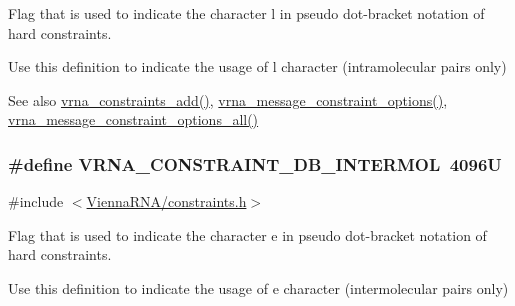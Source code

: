 Flag that is used to indicate the character \textquotesingle{}l\textquotesingle{} in pseudo dot-\/bracket notation of hard constraints. 

Use this definition to indicate the usage of \textquotesingle{}l\textquotesingle{} character (intramolecular pairs only)

\begin{DoxySeeAlso}{See also}
\hyperlink{group__constraints_ga35a401f680969a556858a8dd5f1d07cc}{vrna\+\_\+constraints\+\_\+add()}, \hyperlink{group__constraints_gaa1f20b53bf09ac2e6b0dbb13f7d89670}{vrna\+\_\+message\+\_\+constraint\+\_\+options()}, \hyperlink{group__constraints_gaec7e13fa0465c2acc7a621d1aecb709f}{vrna\+\_\+message\+\_\+constraint\+\_\+options\+\_\+all()} 
\end{DoxySeeAlso}
\hypertarget{group__constraints_ga31d0ebb9755ca8a4acafc14f00ca755d}{}
\subsubsection[{V\+R\+N\+A\+\_\+\+C\+O\+N\+S\+T\+R\+A\+I\+N\+T\+\_\+\+D\+B\+\_\+\+I\+N\+T\+E\+R\+M\+O\+L}]{\setlength{\rightskip}{0pt plus 5cm}\#define V\+R\+N\+A\+\_\+\+C\+O\+N\+S\+T\+R\+A\+I\+N\+T\+\_\+\+D\+B\+\_\+\+I\+N\+T\+E\+R\+M\+O\+L~4096\+U}\label{group__constraints_ga31d0ebb9755ca8a4acafc14f00ca755d}


{\ttfamily \#include $<$\hyperlink{constraints_8h}{Vienna\+R\+N\+A/constraints.\+h}$>$}



Flag that is used to indicate the character \textquotesingle{}e\textquotesingle{} in pseudo dot-\/bracket notation of hard constraints. 

Use this definition to indicate the usage of \textquotesingle{}e\textquotesingle{} character (intermolecular pairs only)

